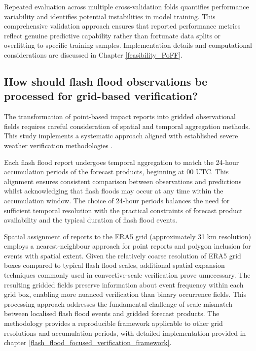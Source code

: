 Repeated evaluation across multiple cross-validation folds quantifies performance variability and identifies potential instabilities in model training. This comprehensive validation approach ensures that reported performance metrics reflect genuine predictive capability rather than fortunate data splits or overfitting to specific training samples. Implementation details and computational considerations are discussed in Chapter \ref{feasibility_PoFF}.


\subsection{How should flash flood observations be processed for grid-based verification?}

The transformation of point-based impact reports into gridded observational fields requires careful consideration of spatial and temporal aggregation methods. This study implements a systematic approach aligned with established severe weather verification methodologies \citep{Tsonevsky_2018, Pillosu_2024}.

Each flash flood report undergoes temporal aggregation to match the 24-hour accumulation periods of the forecast products, beginning at 00 UTC. This alignment ensures consistent comparison between observations and predictions whilst acknowledging that flash floods may occur at any time within the accumulation window. The choice of 24-hour periods balances the need for sufficient temporal resolution with the practical constraints of forecast product availability and the typical duration of flash flood events.

Spatial assignment of reports to the ERA5 grid (approximately 31 km resolution) employs a nearest-neighbour approach for point reports and polygon inclusion for events with spatial extent. Given the relatively coarse resolution of ERA5 grid boxes compared to typical flash flood scales, additional spatial expansion techniques commonly used in convective-scale verification prove unnecessary. The resulting gridded fields preserve information about event frequency within each grid box, enabling more nuanced verification than binary occurrence fields.
This processing approach addresses the fundamental challenge of scale mismatch between localised flash flood events and gridded forecast products. The methodology provides a reproducible framework applicable to other grid resolutions and accumulation periods, with detailed implementation provided in chapter \ref{flash_flood_focused_verification_framework}.



